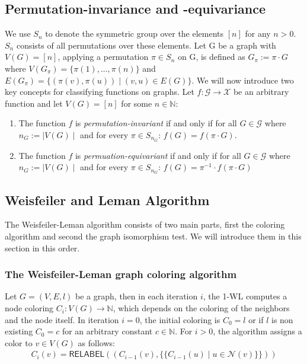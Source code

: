 \documentclass[11pt, dvipsnames, DIV=12]{scrreprt}
\theoremstyle{definition}
\newcommand{\MSopen}{\{\!\!\{}
\newcommand{\MSclose}{\}\!\!\}}
\begin{document}
\subsection{Permutation-invariance and -equivariance}
We use $S_n$ to denote the symmetric group over the elements $[n]$ for any $n > 0$. $S_n$ consists of all permutations over these elements. Let G be a graph with $V(G) = [n]$, applying a permutation $\pi \in S_n$ on G, is defined as $G_\pi := \pi \cdot G$ where $V(G_\pi) = \{\pi(1), \ldots, \pi(n) \}$ and $E(G_\pi) = \{ (\pi(v), \pi(u)) \mid (v,u) \in E(G)\}$. We will now introduce two key concepts for classifying functions on graphs. Let $f: \mathcal{G} \rightarrow \mathcal{X}$ be an arbitrary function and let $V(G) = [n]$ for some $n \in \mathbb{N}$:\\
\begin{enumerate}
    \item The function $f$ is \textit{permutation-invariant} if and only if for all $G \in \mathcal{G}$ where $n_G := \mid V(G) \mid$ and for every $\pi \in S_{n_G}$: $f(G) = f(\pi \cdot G)$.
    \item The function $f$ is \textit{permuation-equivariant} if and only if for all $G \in \mathcal{G}$ where $n_G := \mid V(G) \mid$ and for every $\pi \in S_{n_G}$: $f(G) = \pi^{-1} \cdot f(\pi \cdot G)$
\end{enumerate}


\subsection{Weisfeiler and Leman Algorithm}\label{sec:1-WL Definition}
The Weisfeiler-Leman algorithm consists of two main parts, first the coloring algorithm and second the graph isomorphism test. We will introduce them in this section in this order. 

\subsubsection{The Weisfeiler-Leman graph coloring algorithm}
Let $G = (V,E,l)$ be a graph, then in each iteration $i$, the 1-WL computes a node coloring $C_i: V(G) \rightarrow \mathbb{N}$, which depends on the coloring of the neighbors and the node itself. In iteration $i=0$, the initial coloring is $C_0 = l$ or if $l$ is non existing $C_0 = c$ for an arbitrary constant $c \in \mathbb{N}$. For $i > 0$, the algorithm assigns a color to $v \in V(G)$ as follows:
\begin{align*}
C_i (v) = \textsf{RELABEL}((C_{i-1}(v), \MSopen C_{i-1}(u) \mid u \in \mathcal{N}(v) \MSclose))
\end{align*}
\end{document}
